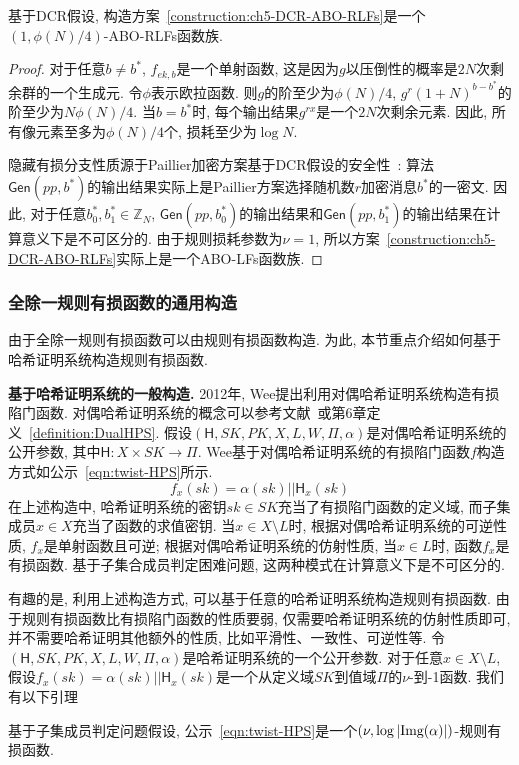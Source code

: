\begin{lemma}
	基于DCR假设, 构造方案~\ref{construction:ch5-DCR-ABO-RLFs}是一个$(1, \phi(N)/4)$-ABO-RLFs函数族.
\end{lemma}
\begin{proof}
	对于任意$b \neq b^*$, $f_{ek, b}$是一个单射函数, 这是因为$g$以压倒性的概率是$2N$次剩余群的一个生成元. 
令$\phi$表示欧拉函数. 则$g$的阶至少为$\phi(N)/4$, $g^r(1+N)^{b-b^*}$的阶至少为$N\phi(N)/4$. 
当$b = b^*$时, 每个输出结果$g^{rx}$是一个$2N$次剩余元素. 因此, 所有像元素至多为$\phi(N)/4$个, 损耗至少为$\log N$.  
	
	隐藏有损分支性质源于Paillier加密方案基于DCR假设的安全性~\cite{Paillier-EUROCRYPT-1999}: 算法$\mathsf{Gen}(pp, b^*)$的输出结果实际上是Paillier方案选择随机数$r$加密消息$b^*$的一密文. 因此, 对于任意$b_0^*, b_1^* \in \mathbb{Z}_N$, $\mathsf{Gen}(pp, b_0^*)$的输出结果和$\mathsf{Gen}(pp, b_1^*)$的输出结果在计算意义下是不可区分的.
由于规则损耗参数为$\nu = 1$, 所以方案~\ref{construction:ch5-DCR-ABO-RLFs}实际上是一个ABO-LFs函数族. 
\end{proof}

\subsubsection{全除一规则有损函数的通用构造}
由于全除一规则有损函数可以由规则有损函数构造. 为此, 本节重点介绍如何基于哈希证明系统构造规则有损函数.

\medskip\noindent\textbf{基于哈希证明系统的一般构造.}
2012年, Wee提出利用对偶哈希证明系统构造有损陷门函数. 对偶哈希证明系统的概念可以参考文献~\cite{Wee-EUROCRYPT-2012}或第6章定义~\ref{definition:DualHPS}. 假设$(\mathsf{H}, SK, PK, X, L, W, \Pi, \alpha)$是对偶哈希证明系统的公开参数, 其中$\mathsf{H}: X \times SK \rightarrow \Pi$.
Wee基于对偶哈希证明系统的有损陷门函数$f$构造方式如公示~\eqref{eqn:twist-HPS}所示. 
\begin{equation}\label{eqn:twist-HPS}
	f_x(sk) = \alpha(sk) || \mathsf{H}_{x}(sk)
\end{equation}
在上述构造中, 哈希证明系统的密钥$sk \in SK$充当了有损陷门函数的定义域, 而子集成员$x \in X$充当了函数的求值密钥. 当$x \in X \setminus L$时, 根据对偶哈希证明系统的可逆性质, $f_x$是单射函数且可逆; 根据对偶哈希证明系统的仿射性质, 当$x \in L$时, 函数$f_x$是有损函数. 基于子集合成员判定困难问题, 这两种模式在计算意义下是不可区分的. 

有趣的是, 利用上述构造方式, 可以基于任意的哈希证明系统构造规则有损函数. 由于规则有损函数比有损陷门函数的性质要弱, 仅需要哈希证明系统的仿射性质即可, 并不需要哈希证明其他额外的性质, 比如平滑性、一致性、可逆性等. 令$(\mathsf{H}, SK, PK, X, L, W, \Pi, \alpha)$是哈希证明系统的一个公开参数. 对于任意$x \in X \setminus L$, 假设$f_x(sk) = \alpha (sk) || \mathsf{H}_x(sk)$是一个从定义域$SK$到值域$\Pi$的$\nu$-到-1函数. 我们有以下引理 
\begin{lemma}
基于子集成员判定问题假设, 公示~\eqref{eqn:twist-HPS}是一个$(\nu, \log |\textup{Img}(\alpha)|)$-规则有损函数. 
\end{lemma} 

